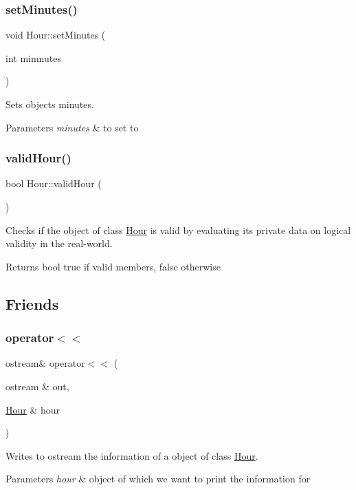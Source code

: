 \subsubsection{\texorpdfstring{set\+Minutes()}{setMinutes()}}
{\footnotesize\ttfamily void Hour\+::set\+Minutes (\begin{DoxyParamCaption}\item[{int}]{mimnutes }\end{DoxyParamCaption})}



Sets object\textquotesingle{}s minutes. 


\begin{DoxyParams}{Parameters}
{\em minutes} & to set to \\
\hline
\end{DoxyParams}
\mbox{\label{group___hour_ga1643bbcd2a1b14cd49f45955c62e8ce1}} 
\subsubsection{\texorpdfstring{valid\+Hour()}{validHour()}}
{\footnotesize\ttfamily bool Hour\+::valid\+Hour (\begin{DoxyParamCaption}{ }\end{DoxyParamCaption})}



Checks if the object of class \hyperlink{class_hour}{Hour} is valid by evaluating it\textquotesingle{}s private data on logical validity in the real-\/world. 

\begin{DoxyReturn}{Returns}
bool true if valid members, false otherwise 
\end{DoxyReturn}


\subsection{Friends}
\mbox{\label{group___hour_gac58157e808c8f449b403949cbd1b2737}} 
\subsubsection{\texorpdfstring{operator$<$$<$}{operator<<}}
{\footnotesize\ttfamily ostream\& operator$<$$<$ (\begin{DoxyParamCaption}\item[{ostream \&}]{out,  }\item[{\hyperlink{class_hour}{Hour} \&}]{hour }\end{DoxyParamCaption})\hspace{0.3cm}{\ttfamily [friend]}}



Writes to ostream the information of a object of class \hyperlink{class_hour}{Hour}. 


\begin{DoxyParams}{Parameters}
{\em hour} & object of which we want to print the information for \\
\hline
\end{DoxyParams}
